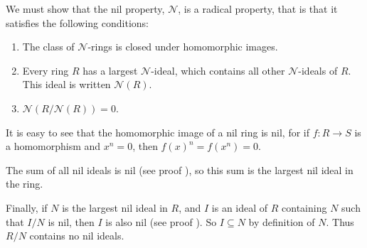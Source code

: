 \documentclass[12pt]{article}
\newcommand{\nilrad}{\mathcal{N}}
\begin{document}
We must show that the nil property, $\nilrad$, is a radical property, that is that it satisfies the following conditions:

\begin{enumerate}
\item The class of $\nilrad$-rings is closed under homomorphic images.
\item Every ring $R$ has a largest $\nilrad$-ideal, which contains all other $\nilrad$-ideals of $R$. This ideal is written $\nilrad(R)$.
\item $\nilrad(R/\nilrad(R)) = 0$.
\end{enumerate}


It is easy to see that the homomorphic image of a nil ring is nil, for if $f \colon R \to S$ is a homomorphism and $x^n = 0$, then $f(x)^n = f(x^n) = 0$.

The sum of all nil ideals is nil (see proof ), so this sum is the largest nil ideal in the ring.

Finally, if $N$ is the largest nil ideal in $R$, and $I$ is an ideal of $R$ containing $N$ such that $I/N$ is nil, then $I$ is also nil (see proof ).  So $I \subseteq N$ by definition of $N$.  Thus $R/N$ contains no nil ideals.
\end{document}
